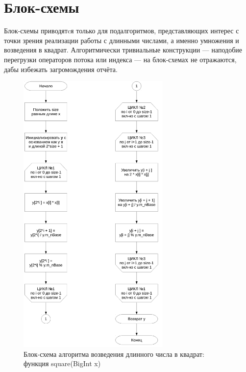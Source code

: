 \documentclass[a4paper,12pt]{article} %
\begin{document}
\section*{Блок-схемы}

Блок-схемы приводятcя только для подалгоритмов, представляющих интерес с точки зрения реализации работы с длинными числами,
а именно умножения и возведения в квадрат.
Алгоритмически тривиальные конструкции --- наподобие перегрузки операторов потока или индекса --- на блок-схемах не отражаются,
дабы избежать загромождения отчёта.

\begin{figure}[ht]
	\centering
	\includegraphics[width=0.67\textwidth]{lr2_square.pdf}
	\caption{Блок-схема алгоритма возведения длинного числа в квадрат: функция square(BigInt x)}
\end{figure}
\end{document}
